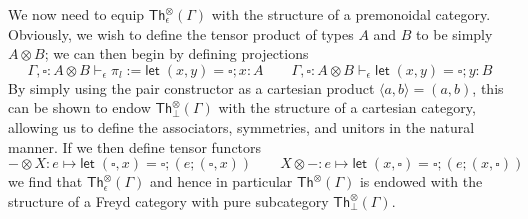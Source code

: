 \documentclass[acmsmall,screen,review]{acmart}
\newcommand{\ms}[1]{\ensuremath{\mathsf{#1}}}
\newcommand{\hasty}[4]{#1 \vdash_{#2} #3: {#4}}
\newcommand{\invar}{\square}
\begin{document}
We now need to equip $\ms{Th}_\epsilon^\otimes(\Gamma)$ with the structure of a premonoidal
category. Obviously, we wish to define the tensor product of types $A$ and $B$ to be simply $A
\otimes B$; we can then begin by defining projections
\begin{equation}
  \hasty{\Gamma, \invar : A \otimes B}{\epsilon}{\pi_l := \ms{let}\;(x, y) = \invar; x}{A} \qquad 
  \hasty{\Gamma, \invar : A \otimes B}{\epsilon}{\ms{let}\;(x, y) = \invar; y}{B}
\end{equation}
By simply using the pair constructor as a cartesian product $\langle a, b \rangle = (a, b)$, this
can be shown to endow $\ms{Th}_\bot^\otimes(\Gamma)$ with the structure of a cartesian category,
allowing us to define the associators, symmetries, and unitors in the natural manner. If we then
define tensor functors
\begin{equation}
  - \otimes X : e \mapsto \ms{let}\;(\invar, x) = \invar; (e ; (\invar, x)) \qquad
  X \otimes - : e \mapsto \ms{let}\;(x, \invar) = \invar; (e ; (x, \invar))
\end{equation}
we find that $\ms{Th}_\epsilon^\otimes(\Gamma)$ and hence in particular $\ms{Th}^\otimes(\Gamma)$ is
endowed with the structure of a Freyd category with pure subcategory $\ms{Th}_\bot^\otimes(\Gamma)$.
\end{document}
